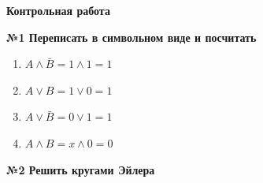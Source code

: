 



    \begin{center}
        \textbf{Контрольная работа}
    \end{center}

    \begin{center}
        \textbf{№1 Переписать в символьном виде и посчитать}
    \end{center}

    \begin{enumerate}
        \item $A \wedge \bar B = 1 \wedge 1 = 1$
        \item $A \vee B = 1 \vee 0 = 1$
        \item $A \vee \bar B = 0 \vee 1 = 1$
        \item $A \wedge B = x \wedge 0 = 0$
    \end{enumerate}

    \begin{center}
        \textbf{№2 Решить кругами Эйлера}
    \end{center}

